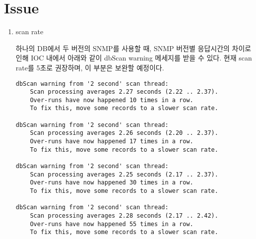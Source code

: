 \documentclass[11pt
  , a4paper
  , article
  , oneside
]{memoir}
\begin{document}
\chapter{Issue}
\begin{enumerate}[1)]
\item {scan rate} \par
하나의 DB에서 두 버전의 SNMP를 사용할 때, SNMP 버전별 응답시간의 차이로 인해 IOC 내에서 아래와 같이 dbScan warning 메세지를 받을 수 있다. 현재 scan rate를 5초로 권장하며, 이 부분은 보완할 예정이다.


{\scriptsize
\begin{verbatim}
dbScan warning from '2 second' scan thread:
	Scan processing averages 2.27 seconds (2.22 .. 2.37).
	Over-runs have now happened 10 times in a row.
	To fix this, move some records to a slower scan rate.

dbScan warning from '2 second' scan thread:
	Scan processing averages 2.26 seconds (2.20 .. 2.37).
	Over-runs have now happened 17 times in a row.
	To fix this, move some records to a slower scan rate.

dbScan warning from '2 second' scan thread:
	Scan processing averages 2.25 seconds (2.17 .. 2.37).
	Over-runs have now happened 30 times in a row.
	To fix this, move some records to a slower scan rate.

dbScan warning from '2 second' scan thread:
	Scan processing averages 2.28 seconds (2.17 .. 2.42).
	Over-runs have now happened 55 times in a row.
	To fix this, move some records to a slower scan rate.
\end{verbatim}
}


\end{enumerate}

\clearpage
\end{document}
